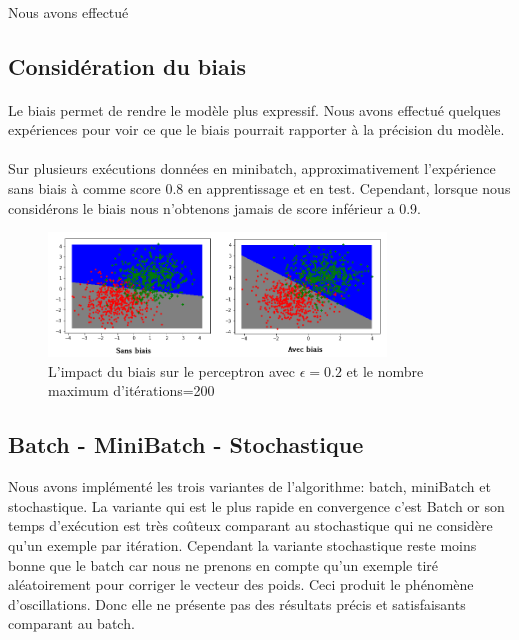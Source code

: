 \documentclass{report}
\begin{document}
\paragraph{}
Nous avons effectué 
\subsection{Considération du biais}
\paragraph{}
Le biais permet de rendre le modèle plus expressif. Nous avons effectué quelques expériences pour voir ce que le biais pourrait rapporter à la précision du modèle.
\paragraph{}
Sur plusieurs exécutions données en minibatch, approximativement l'expérience sans biais à comme score 0.8 en apprentissage et en test. Cependant, lorsque nous considérons le biais nous n'obtenons jamais de score inférieur a 0.9.
 \begin{figure}[H]
	\begin{center}
		\includegraphics[width=0.8\textwidth]{sansbiaisVSbiais.png}
		\caption{L'impact du biais sur le perceptron avec $\epsilon=0.2$ et le nombre maximum d'itérations=200}
	\end{center}
\end{figure}

 
\subsection{Batch - MiniBatch - Stochastique}
Nous avons implémenté les trois variantes de l'algorithme: batch, miniBatch et stochastique. La variante qui est le plus rapide en convergence c'est Batch or son temps d'exécution est très coûteux comparant au stochastique qui ne considère qu'un exemple par itération. Cependant la variante stochastique reste moins bonne que le batch car nous ne prenons en compte qu'un exemple tiré aléatoirement pour corriger le vecteur des poids. Ceci produit le phénomène d'oscillations. Donc elle ne présente pas des résultats précis et satisfaisants comparant au batch.
\end{document}
